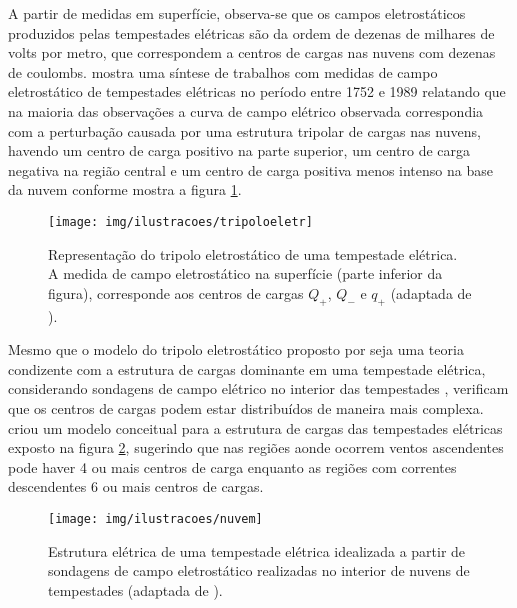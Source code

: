 A partir de medidas em superfície, observa-se que os campos eletrostáticos produzidos pelas tempestades elétricas são da ordem de dezenas de milhares de volts por metro, que correspondem a centros de cargas nas nuvens com dezenas de coulombs. 
 mostra uma síntese de trabalhos com medidas de campo eletrostático de tempestades elétricas no período entre 1752 e 1989 relatando que na maioria das observações a curva de campo elétrico observada correspondia com a perturbação causada por uma estrutura tripolar de cargas nas nuvens, havendo um centro de carga positivo na parte superior, um centro de carga negativa na região central e um centro de carga positiva menos intenso na base da nuvem conforme mostra a figura \ref{fig:tripeletr}.


\begin{figure}[ht]
\centering 
\texttt{[image: img/ilustracoes/tripoloeletr]}
\caption{Representação do tripolo eletrostático de uma tempestade elétrica. A medida de campo eletrostático na superfície (parte inferior da figura), corresponde aos centros de cargas $Q_{+}$, $Q_{-}$ e $q_{+}$ (adaptada de ).}
\label{fig:tripeletr}
\end{figure}


Mesmo que o modelo do tripolo eletrostático proposto por  seja uma teoria condizente com a estrutura de cargas dominante em uma tempestade elétrica, considerando sondagens de campo elétrico no interior das tempestades , verificam que os centros de cargas podem estar distribuídos de maneira mais complexa. 
 criou um modelo conceitual para a estrutura de cargas das tempestades elétricas exposto na figura \ref{fig:multipcentros}, sugerindo que nas regiões aonde ocorrem ventos ascendentes pode haver 4 ou mais centros de carga enquanto as regiões com correntes descendentes 6 ou mais centros de cargas.


\begin{figure}[ht]
\centering 
\texttt{[image: img/ilustracoes/nuvem]}
\caption{Estrutura elétrica de uma tempestade elétrica idealizada a partir de sondagens de campo eletrostático realizadas no interior de nuvens de tempestades (adaptada de ).}
\label{fig:multipcentros}
\end{figure}


